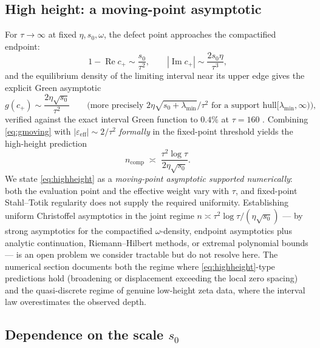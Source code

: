 \documentclass[11pt]{amsart}
\theoremstyle{definition}
\theoremstyle{remark}
\newcommand{\eps}{\varepsilon}
\DeclareMathOperator{\Rea}{Re}
\DeclareMathOperator{\Ima}{Im}
\begin{document}
\subsection{High height: a moving-point asymptotic}\label{sec:highheight}

For $\tau\to\infty$ at fixed $\eta,s_0,\omega$, the defect point approaches
the compactified endpoint:
\[
1-\Rea c_+\sim\frac{s_0}{\tau^2},
\qquad
|\Ima c_+|\sim\frac{2s_0\eta}{\tau^3},
\]
and the equilibrium density of the limiting interval near its upper edge
gives the explicit Green asymptotic
\begin{equation}\label{eq:gmoving}
g(c_+)\sim\frac{2\eta\sqrt{s_0}}{\tau^2}
\qquad\Big(\text{more precisely }
2\eta\sqrt{s_0+\lambda_{\min}}/\tau^2\text{ for a support hull
}[\lambda_{\min},\infty)\Big),
\end{equation}
verified against the exact interval Green function to $0.4\%$ at
$\tau=160$ \cite{LabRecord}. Combining \eqref{eq:gmoving} with
$|\eps_{\mathrm{eff}}|\sim2/\tau^2$ \emph{formally} in the fixed-point
threshold yields the high-height prediction
\begin{equation}\label{eq:highheight}
n_{\mathrm{comp}}
\;\asymp\;
\frac{\tau^2\log\tau}{2\eta\sqrt{s_0}} .
\end{equation}
We state \eqref{eq:highheight} as a \emph{moving-point asymptotic supported
numerically}: both the evaluation point and the effective weight vary with
$\tau$, and fixed-point Stahl--Totik regularity does not supply the required
uniformity. Establishing uniform Christoffel asymptotics in the joint regime
$n\asymp\tau^2\log\tau/(\eta\sqrt{s_0})$ --- by strong asymptotics for the
compactified $\omega$-density, endpoint asymptotics plus analytic
continuation, Riemann--Hilbert methods, or extremal polynomial bounds --- is
an open problem we consider tractable but do not resolve here. The numerical
section documents both the regime where \eqref{eq:highheight}-type
predictions hold (broadening or displacement exceeding the local zero
spacing) and the quasi-discrete regime of genuine low-height zeta data,
where the interval law overestimates the observed depth.

\subsection{Dependence on the scale $s_0$}\label{sec:s0}
\end{document}

